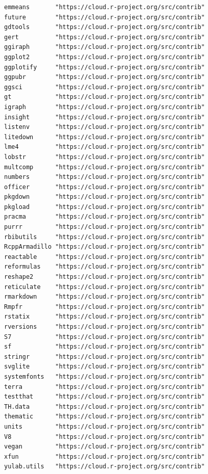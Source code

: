 \documentclass[
  letterpaper,
  DIV=11,
  numbers=noendperiod]{scrreprt}
\begin{document}
\begin{verbatim}
emmeans       "https://cloud.r-project.org/src/contrib"
future        "https://cloud.r-project.org/src/contrib"
gdtools       "https://cloud.r-project.org/src/contrib"
gert          "https://cloud.r-project.org/src/contrib"
ggiraph       "https://cloud.r-project.org/src/contrib"
ggplot2       "https://cloud.r-project.org/src/contrib"
ggplotify     "https://cloud.r-project.org/src/contrib"
ggpubr        "https://cloud.r-project.org/src/contrib"
ggsci         "https://cloud.r-project.org/src/contrib"
gt            "https://cloud.r-project.org/src/contrib"
igraph        "https://cloud.r-project.org/src/contrib"
insight       "https://cloud.r-project.org/src/contrib"
listenv       "https://cloud.r-project.org/src/contrib"
litedown      "https://cloud.r-project.org/src/contrib"
lme4          "https://cloud.r-project.org/src/contrib"
lobstr        "https://cloud.r-project.org/src/contrib"
multcomp      "https://cloud.r-project.org/src/contrib"
numbers       "https://cloud.r-project.org/src/contrib"
officer       "https://cloud.r-project.org/src/contrib"
pkgdown       "https://cloud.r-project.org/src/contrib"
pkgload       "https://cloud.r-project.org/src/contrib"
pracma        "https://cloud.r-project.org/src/contrib"
purrr         "https://cloud.r-project.org/src/contrib"
rbibutils     "https://cloud.r-project.org/src/contrib"
RcppArmadillo "https://cloud.r-project.org/src/contrib"
reactable     "https://cloud.r-project.org/src/contrib"
reformulas    "https://cloud.r-project.org/src/contrib"
reshape2      "https://cloud.r-project.org/src/contrib"
reticulate    "https://cloud.r-project.org/src/contrib"
rmarkdown     "https://cloud.r-project.org/src/contrib"
Rmpfr         "https://cloud.r-project.org/src/contrib"
rstatix       "https://cloud.r-project.org/src/contrib"
rversions     "https://cloud.r-project.org/src/contrib"
S7            "https://cloud.r-project.org/src/contrib"
sf            "https://cloud.r-project.org/src/contrib"
stringr       "https://cloud.r-project.org/src/contrib"
svglite       "https://cloud.r-project.org/src/contrib"
systemfonts   "https://cloud.r-project.org/src/contrib"
terra         "https://cloud.r-project.org/src/contrib"
testthat      "https://cloud.r-project.org/src/contrib"
TH.data       "https://cloud.r-project.org/src/contrib"
thematic      "https://cloud.r-project.org/src/contrib"
units         "https://cloud.r-project.org/src/contrib"
V8            "https://cloud.r-project.org/src/contrib"
vegan         "https://cloud.r-project.org/src/contrib"
xfun          "https://cloud.r-project.org/src/contrib"
yulab.utils   "https://cloud.r-project.org/src/contrib"

\end{verbatim}
\end{document}
